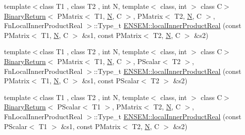 \begin{DoxyCompactItemize}
{\footnotesize template$<$class T1 , class T2 , int N, template$<$ class, int $>$ class C$>$ }\\\mbox{\hyperlink{structBinaryReturn}{Binary\+Return}}$<$ P\+Matrix$<$ T1, \mbox{\hyperlink{adat__devel_2lib_2hadron_2operator__name__util_8cc_a7722c8ecbb62d99aee7ce68b1752f337}{N}}, C $>$, P\+Matrix$<$ T2, \mbox{\hyperlink{adat__devel_2lib_2hadron_2operator__name__util_8cc_a7722c8ecbb62d99aee7ce68b1752f337}{N}}, C $>$, Fn\+Local\+Inner\+Product\+Real $>$\+::Type\+\_\+t \mbox{\hyperlink{group__primmatrix_ga512767c96aa10eafdf3b60be8dd2e9bb}{E\+N\+S\+E\+M\+::local\+Inner\+Product\+Real}} (const P\+Matrix$<$ T1, \mbox{\hyperlink{adat__devel_2lib_2hadron_2operator__name__util_8cc_a7722c8ecbb62d99aee7ce68b1752f337}{N}}, C $>$ \&s1, const P\+Matrix$<$ T2, \mbox{\hyperlink{adat__devel_2lib_2hadron_2operator__name__util_8cc_a7722c8ecbb62d99aee7ce68b1752f337}{N}}, C $>$ \&s2)
\item 
{\footnotesize template$<$class T1 , class T2 , int N, template$<$ class, int $>$ class C$>$ }\\\mbox{\hyperlink{structBinaryReturn}{Binary\+Return}}$<$ P\+Matrix$<$ T1, \mbox{\hyperlink{adat__devel_2lib_2hadron_2operator__name__util_8cc_a7722c8ecbb62d99aee7ce68b1752f337}{N}}, C $>$, P\+Scalar$<$ T2 $>$, Fn\+Local\+Inner\+Product\+Real $>$\+::Type\+\_\+t \mbox{\hyperlink{group__primmatrix_ga9db3f5557c105ded2a1e426229646f23}{E\+N\+S\+E\+M\+::local\+Inner\+Product\+Real}} (const P\+Matrix$<$ T1, \mbox{\hyperlink{adat__devel_2lib_2hadron_2operator__name__util_8cc_a7722c8ecbb62d99aee7ce68b1752f337}{N}}, C $>$ \&s1, const P\+Scalar$<$ T2 $>$ \&s2)
\item 
{\footnotesize template$<$class T1 , class T2 , int N, template$<$ class, int $>$ class C$>$ }\\\mbox{\hyperlink{structBinaryReturn}{Binary\+Return}}$<$ P\+Scalar$<$ T1 $>$, P\+Matrix$<$ T2, \mbox{\hyperlink{adat__devel_2lib_2hadron_2operator__name__util_8cc_a7722c8ecbb62d99aee7ce68b1752f337}{N}}, C $>$, Fn\+Local\+Inner\+Product\+Real $>$\+::Type\+\_\+t \mbox{\hyperlink{group__primmatrix_ga8a2b85a888121b8b0ff46870c7705474}{E\+N\+S\+E\+M\+::local\+Inner\+Product\+Real}} (const P\+Scalar$<$ T1 $>$ \&s1, const P\+Matrix$<$ T2, \mbox{\hyperlink{adat__devel_2lib_2hadron_2operator__name__util_8cc_a7722c8ecbb62d99aee7ce68b1752f337}{N}}, C $>$ \&s2)
\item 

\end{DoxyCompactItemize}
